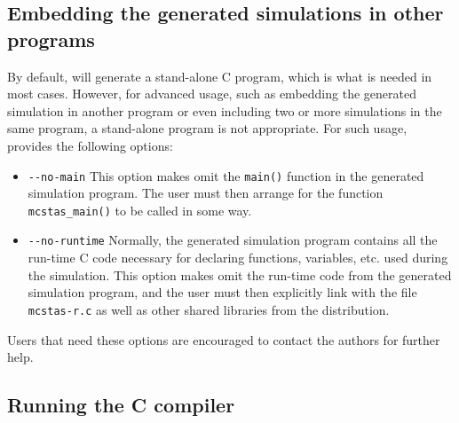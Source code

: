 \subsection{Embedding the generated simulations in other programs}

By default, \mcs will generate a stand-alone C program, which is what is needed
in most cases. However, for advanced usage, such as embedding the generated
simulation in another program or even including two or more simulations in the
same program, a stand-alone program is not appropriate.
For such usage, \mcs provides the following options:
\begin{itemize}
\item \verb+--no-main+ This option makes \mcs omit the \verb+main()+ function
  in the generated simulation program. The user must then arrange for the
  function \verb+mcstas_main()+ to be called in some way.
\item \verb+--no-runtime+ Normally, the
  generated simulation program contains all the run-time C code necessary for
  declaring functions, variables, etc. used during the simulation.  This
  option makes \mcs omit the run-time code from the generated
  simulation program, and the user must then explicitly link with the file
  \verb+mcstas-r.c+ as well as other shared libraries
  from the \MCS distribution.
\end{itemize}
Users that need these options are encouraged to contact the authors for further
help.


\subsection{Running the C compiler}
\label{s:compile}

